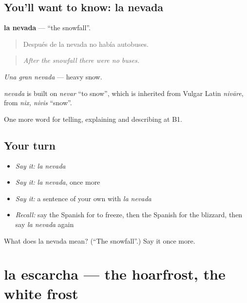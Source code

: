 \subsection*{You'll want to know: la nevada}
\textbf{la nevada} — \textquotedblleft{}the snowfall\textquotedblright{}.

\begin{quote}
Después de la nevada no había autobuses.
\end{quote}

\begin{quote}
\emph{After the snowfall there were no buses.}
\end{quote}

\emph{Una gran nevada} — heavy snow.

\begin{cousinweb}
\emph{nevada} is built on \emph{nevar} \textquotedblleft{}to snow\textquotedblright{}, which is inherited from Vulgar Latin \emph{nivāre}, from \emph{nix, nivis} \textquotedblleft{}snow\textquotedblright{}.
\end{cousinweb}

\begin{grammarlens}[title={What you've built}]
One more word for telling, explaining and describing at B1.
\end{grammarlens}

\subsection*{Your turn}
\begin{itemize}
\raggedright
  \item \emph{Say it:} \emph{la nevada}
  \item \emph{Say it:} \emph{la nevada}, once more
  \item \emph{Say it:} a sentence of your own with \emph{la nevada}
  \item \emph{Recall:} say the Spanish for to freeze, then the Spanish for the blizzard, then say \emph{la nevada} again
\end{itemize}

\begin{tcolorbox}[breakable,colback=teal!4,colframe=teal!35!black,title={Before you move on}]
What does la nevada mean? (\textquotedblleft{}The snowfall\textquotedblright{}.) Say it once more.
\end{tcolorbox}
\section[la escarcha]{la escarcha — the hoarfrost, the white frost}

